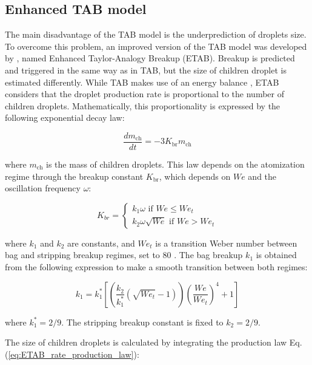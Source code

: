 \subsection{Enhanced TAB model}

The main disadvantage of the TAB model is the underprediction of droplets size. To overcome this problem, an improved version of the TAB model was developed by , named Enhanced Taylor-Analogy Breakup (ETAB). Breakup is predicted and triggered in the same way as in TAB, but the size of children droplet is estimated differently. While TAB makes use of an energy balance , ETAB considers that the droplet production rate is proportional to the number of children droplets. Mathematically, this proportionality is expressed by the following exponential decay law:

\begin{equation}
\label{eq:ETAB_rate_production_law}
\frac{d m_\mathrm{ch}}{dt} = - 3 K_\mathrm{br} m_\mathrm{ch}
\end{equation}

where $m_\mathrm{ch}$ is the mass of children droplets. This law depends on the atomization regime through the breakup constant $K_\mathrm{br}$, which depends on $We$ and the oscillation frequency $\omega$:

\begin{equation}
\label{eq:ETAB_Kbr_equation}
K_{br} =
\left\{
    \begin{split}
    k_1 \omega \,\,\mathrm{if}\,\,We \leq We_t \\ 
    k_2 \omega \sqrt{We} \,\,\mathrm{if}\,\,We > We_t
    \end{split}
\right.
\end{equation}

where $k_1$ and $k_2$ are constants, and $We_t$ is a transition Weber number between bag and stripping breakup regimes, set to 80 . The bag breakup $k_1$ is obtained from the following expression to make a smooth transition between both regimes:

\begin{equation}
k_1 = k_1^* \left[\left(  \frac{k_2}{k_1^*} \left( \sqrt{We_t} - 1 \right) \right) \left( \frac{We}{We_t} \right)^4 + 1 \right]
\end{equation}

where $k_1^* = 2/9$. The stripping breakup constant is fixed to $k_2 = 2/9$.

The size of children droplets is calculated by integrating the production law Eq. (\ref{eq:ETAB_rate_production_law}):

